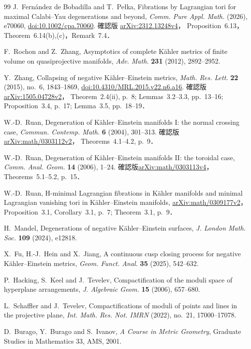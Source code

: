 \documentclass[a4paper,11pt]{ltjsarticle}
\numberwithin{equation}{section}
\theoremstyle{plain}
\theoremstyle{definition}
\theoremstyle{remark}
\begin{document}
\begin{thebibliography}{99}
J.~Fernández de Bobadilla and T.~Pełka,
\newblock Fibrations by Lagrangian tori for maximal Calabi--Yau degenerations and beyond,
\newblock \emph{Comm. Pure Appl. Math.} (2026), e70060,
\newblock \href{https://doi.org/10.1002/cpa.70060}{doi:10.1002/cpa.70060}.
\newblock 確認版 \href{https://arxiv.org/abs/2312.13248v4}{arXiv:2312.13248v4}，
Proposition~6.13，Theorem~6.14(b),(c)，Remark~7.4．

F.~Rochon and Z.~Zhang,
\newblock Asymptotics of complete K\"ahler metrics of finite volume on quasiprojective manifolds,
\newblock \emph{Adv. Math.} \textbf{231} (2012), 2892--2952.

Y.~Zhang,
\newblock Collapsing of negative Kähler--Einstein metrics,
\newblock \emph{Math. Res. Lett.} \textbf{22} (2015), no.~6, 1843--1869,
\href{https://doi.org/10.4310/MRL.2015.v22.n6.a16}{doi:10.4310/MRL.2015.v22.n6.a16}.
\newblock 確認版\href{https://arxiv.org/abs/1505.04728v2}{arXiv:1505.04728v2}，
Theorem~2.4(ii), p.~8; Lemmas~3.2--3.3, pp.~13--16;
Proposition~3.4, p.~17; Lemma~3.5, pp.~18--19．

W.-D.~Ruan,
\newblock Degeneration of Kähler--Einstein manifolds I: the normal crossing case,
\newblock \emph{Commun. Contemp. Math.} \textbf{6} (2004), 301--313.
\newblock 確認版\href{https://arxiv.org/abs/math/0303112v2}{arXiv:math/0303112v2}，
Theorems~4.1--4.2, p.~9．

W.-D.~Ruan,
\newblock Degeneration of Kähler--Einstein manifolds II: the toroidal case,
\newblock \emph{Comm. Anal. Geom.} \textbf{14} (2006), 1--24.
\newblock 確認版\href{https://arxiv.org/abs/math/0303113v4}{arXiv:math/0303113v4}，
Theorems~5.1--5.2, p.~15．

W.-D.~Ruan,
\newblock H-minimal Lagrangian fibrations in Kähler manifolds and minimal Lagrangian vanishing tori in Kähler--Einstein manifolds,
\newblock \href{https://arxiv.org/abs/math/0309177v2}{arXiv:math/0309177v2}，
Proposition~3.1, Corollary~3.1, p.~7; Theorem~3.1, p.~9．

H.~Mandel,
\newblock Degenerations of negative K\"ahler--Einstein surfaces,
\newblock \emph{J. London Math. Soc.} \textbf{109} (2024), e12818.

X.~Fu, H.-J.~Hein and X.~Jiang,
\newblock A continuous cusp closing process for negative K\"ahler--Einstein metrics,
\newblock \emph{Geom. Funct. Anal.} \textbf{35} (2025), 542--632.

P.~Hacking, S.~Keel and J.~Tevelev,
\newblock Compactification of the moduli space of hyperplane arrangements,
\newblock \emph{J. Algebraic Geom.} \textbf{15} (2006), 657--680.

L.~Schaffler and J.~Tevelev,
\newblock Compactifications of moduli of points and lines in the projective plane,
\newblock \emph{Int. Math. Res. Not. IMRN} (2022), no.~21, 17000--17078.

D.~Burago, Y.~Burago and S.~Ivanov,
\newblock \emph{A Course in Metric Geometry},
\newblock Graduate Studies in Mathematics 33, AMS, 2001.

\end{thebibliography}
\end{document}
